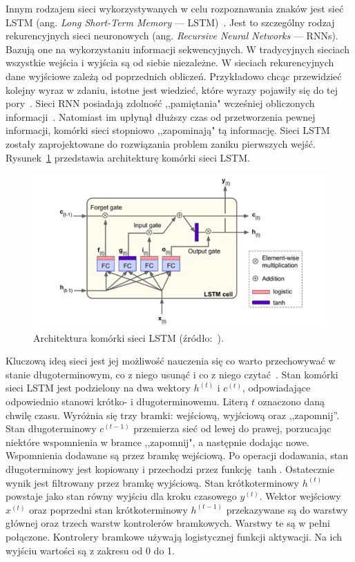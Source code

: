 Innym rodzajem sieci wykorzystywanych w celu rozpoznawania znaków jest sieć LSTM (ang. \textit{Long Short-Term Memory} --- LSTM)~\cite{6795963}.
Jest to szczególny rodzaj rekurencyjnych sieci neuronowych (ang. \textit{Recursive Neural Networks} --- RNNs).
Bazują one na wykorzystaniu informacji sekwencyjnych.
W tradycyjnych sieciach wszystkie wejścia i wyjścia są od siebie niezależne.
W sieciach rekurencyjnych dane wyjściowe zależą od poprzednich obliczeń.
Przykładowo chcąc przewidzieć kolejny wyraz w zdaniu, istotne jest wiedzieć, które wyrazy pojawiły się do tej pory~\cite{lawrynowicz_lstm}.
Sieci RNN posiadają zdolność ,,pamiętania" wcześniej obliczonych informacji~\cite{lawrynowicz_lstm}.
Natomiast im upłynął dłuższy czas od przetworzenia pewnej informacji, komórki sieci stopniowo ,,zapominają" tą informację.
Sieci LSTM zostały zaprojektowane do rozwiązania problem zaniku pierwszych wejść.
Rysunek~\ref{fig:lstm} przedstawia architekturę komórki sieci LSTM\@.
\begin{figure}[!ht]
    \centering
    \includegraphics[scale=0.6]{Pictures/lstm}
    \caption{Architektura komórki sieci LSTM (źródło:~\cite{10.5555/3153997}).}
    \label{fig:lstm}
\end{figure}
\FloatBarrier
Kluczową ideą sieci jest jej możliwość nauczenia się co warto przechowywać w stanie długoterminowym, co z niego usunąć i co z niego czytać~\cite{lawrynowicz_lstm}.
Stan komórki sieci LSTM jest podzielony na dwa wektory $h^{(t)}$ i $c^{(t)}$, odpowiadające odpowiednio stanowi krótko- i długoterminowemu.
Literą $t$ oznaczono daną chwilę czasu.
Wyróżnia się trzy bramki: wejściową, wyjściową oraz ,,zapomnij''.
Stan długoterminowy $c^{(t-1)}$ przemierza sieć od lewej do prawej, porzucając niektóre wspomnienia w bramce ,,zapomnij", a następnie dodając nowe.
Wspomnienia dodawane są przez bramkę wejściową.
Po operacji dodawania, stan długoterminowy jest kopiowany i przechodzi przez funkcję $\tanh$.
Ostatecznie wynik jest filtrowany przez bramkę wyjściową.
Stan krótkoterminowy $h^{(t)}$ powstaje jako stan równy wyjściu dla kroku czasowego $y^{(t)}$.
Wektor wejściowy $x^{(t)}$ oraz poprzedni stan krótkoterminowy $h^{(t-1)}$ przekazywane są do warstwy głównej oraz trzech warstw kontrolerów bramkowych.
Warstwy te są w pełni połączone.
Kontrolery bramkowe używają logistycznej funkcji aktywacji.
Na ich wyjściu wartości są z zakresu od 0 do 1.

